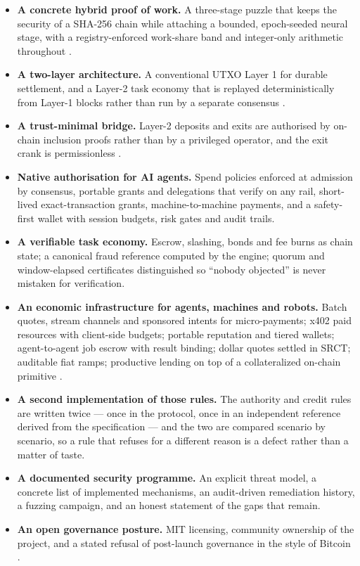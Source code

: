 \documentclass{article}
\begin{document}
\begin{itemize}
\item \textbf{A concrete hybrid proof of work.} A three-stage puzzle that keeps
the security of a SHA-256 chain while attaching a bounded, epoch-seeded neural
stage, with a registry-enforced work-share band and integer-only arithmetic
throughout \cite{zawy2019darkgravity,cryptonote2012whitepaper}.
\item \textbf{A two-layer architecture.} A conventional UTXO Layer 1 for durable
settlement, and a Layer-2 task economy that is replayed deterministically from
Layer-1 blocks rather than run by a separate consensus \cite{dwork2012mining,
trivedi2017sok}.
\item \textbf{A trust-minimal bridge.} Layer-2 deposits and exits are authorised
by on-chain inclusion proofs rather than by a privileged operator, and the exit
crank is permissionless \cite{wood2014decentralized}.
\item \textbf{Native authorisation for AI agents.} Spend policies enforced at
admission by consensus, portable grants and delegations that verify on any rail,
short-lived exact-transaction grants, machine-to-machine payments, and a
safety-first wallet with session budgets, risk gates and audit trails.
\item \textbf{A verifiable task economy.} Escrow, slashing, bonds and fee burns as
chain state; a canonical fraud reference computed by the engine; quorum and
window-elapsed certificates distinguished so ``nobody objected'' is never
mistaken for verification.
\item \textbf{An economic infrastructure for agents, machines and robots.}
Batch quotes, stream channels and sponsored intents for micro-payments; x402
paid resources with client-side budgets; portable reputation and tiered wallets;
agent-to-agent job escrow with result binding; dollar quotes settled in SRCT;
auditable fiat ramps; productive lending on top of a collateralized on-chain
primitive \cite{yao2023survey}.
\item \textbf{A second implementation of those rules.} The authority and credit
rules are written twice --- once in the protocol, once in an independent
reference derived from the specification --- and the two are compared scenario
by scenario, so a rule that refuses for a different reason is a defect rather
than a matter of taste.
\item \textbf{A documented security programme.} An explicit threat model, a
concrete list of implemented mechanisms, an audit-driven remediation history, a
fuzzing campaign, and an honest statement of the gaps that remain.
\item \textbf{An open governance posture.} MIT licensing, community
ownership of the project, and a stated
refusal of post-launch governance in the style of Bitcoin
\cite{nakamoto2008bitcoin,bonneau2018sok}.
\end{itemize}
\end{document}
